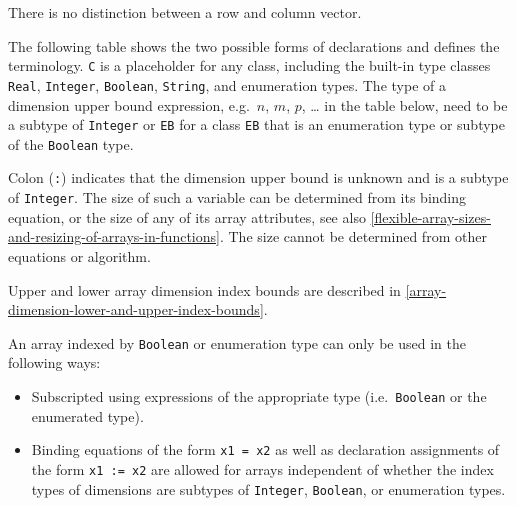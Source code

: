 \begin{nonnormative}
There is no distinction between a row and column vector.
\end{nonnormative}

The following table shows the two possible forms of declarations and
defines the terminology. \lstinline!C! is a placeholder for any class, including the
built-in type classes \lstinline!Real!, \lstinline!Integer!, \lstinline!Boolean!, \lstinline!String!, and enumeration
types. The type of a dimension upper bound expression, e.g.\ $n$, $m$, $p$, \ldots
in the table below, need to be a subtype of \lstinline!Integer! or \lstinline!EB! for a class \lstinline!EB!
that is an enumeration type or subtype of the \lstinline!Boolean! type.

Colon (\lstinline!:!) indicates that the dimension upper bound is unknown and is a subtype of \lstinline!Integer!.  The size of such a variable can be determined from its binding equation, or the
size of any of its array attributes, see also \cref{flexible-array-sizes-and-resizing-of-arrays-in-functions}.  The size cannot be determined from other equations or algorithm.

Upper and lower array dimension index bounds are described in \cref{array-dimension-lower-and-upper-index-bounds}.

An array indexed by \lstinline!Boolean! or enumeration type can only be used in the following ways:
\begin{itemize}
\item
  Subscripted using expressions of the appropriate type (i.e.\ \lstinline!Boolean! or the enumerated type).
\item
  Binding equations of the form \lstinline!x1 = x2! as well as declaration assignments of the form \lstinline!x1 := x2! are allowed for arrays independent of
  whether the index types of dimensions are subtypes of \lstinline!Integer!, \lstinline!Boolean!, or enumeration types.
\end{itemize}

